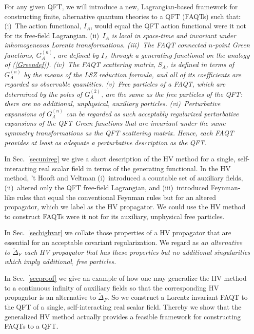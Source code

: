 \documentclass[a4paper,12pt]{article}
\newcommand{\akcija}{I}
\newcommand{\akcijaA}{\akcija_A}
\newcommand{\prop}{\widetilde{\Delta}}
\newcommand{\propF}{\prop_F}
\newcommand{\Gf}{G^{(n)}}
\newcommand{\GfA}{\Gf_A}
\newcommand{\SmA}{S_A}
\begin{document}
For any given QFT, we will introduce a new, Lagrangian-based framework for constructing finite, alternative quantum theories to a QFT (FAQTs) such that: (i)~The action functional, $\akcijaA$, would equal the QFT action functional were it not for its free-field Lagrangian. (ii)~$\akcijaA$ \it is local in space-time and invariant under inhomogeneous Lorentz transformations. \rm (iii)~The FAQT connected $n$-point Green functions, $\GfA$, are defined by $\akcijaA$ through a generating functional on the analogy of (\ref{Greendef}). (iv)~The FAQT scattering matrix, $\SmA$, is defined in terms of $\GfA$ by the means of the LSZ reduction formula, and \it all of its coefficients are regarded as observable quantities. \rm (v)~Free particles of a FAQT, which are determined by the poles of $G^{(2)}_A$, are \it the same \rm as the free particles of the QFT: there are no additional, unphysical, auxiliary particles. (vi)~Perturbative expansions of $\GfA$ can be regarded as such acceptably regularized perturbative expansions of the QFT Green functions that are \it invariant under the same symmetry transformations as the QFT scattering matrix. \rm Hence, each FAQT provides at least as adequate a perturbative description as the QFT.

In Sec.~\ref{secunireg} we give a short description of the HV method for a single, self-interacting real scalar field in terms of the generating functional. In the HV method,  't Hooft and Veltman (i)~introduced a countable set of auxiliary fields, (ii)~altered only the QFT free-field Lagrangian, and (iii)~introduced Feynman-like rules that equal the conventional Feynman rules but for an altered propagator, which we label as the HV propagator. We could use the HV method to construct FAQTs were it not for its auxiliary, unphysical free particles.

In Sec.~\ref{sechighvar} we collate those properties of a HV propagator that are essential for an acceptable covariant regularization. We regard as \it an alternative \rm to $\propF$ each HV propagator that has these properties but no additional singularities which imply additional, free particles.

In Sec.~\ref{secproof} we give an example of how one may generalize the HV method to a continuous infinity of auxiliary fields so that the corresponding HV propagator is an alternative to $\propF$. So we construct a Lorentz invariant FAQT to the QFT of a single, self-interacting real scalar field. Thereby we show that the generalized HV method actually provides a feasible framework for constructing FAQTs to a QFT.
\end{document}
